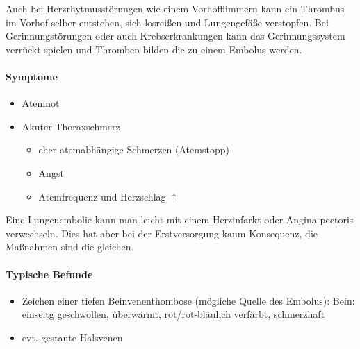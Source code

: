 Auch bei Herzrhytmusstörungen wie einem
Vorhofflimmern kann ein Thrombus im Vorhof selber entstehen, 
sich losreißen und Lungengefäße verstopfen. Bei
Gerinnungstörungen oder auch Krebserkrankungen kann das
Gerinnungssystem verrückt spielen und Thromben bilden die
zu einem Embolus werden.


\paragraph{Symptome}

\begin{itemize}
    \item Atemnot
    \item Akuter Thoraxschmerz
    \begin{itemize}
        \item eher atemabhängige Schmerzen (Atemstopp)
    \end{itemize}
    \begin{itemize}
        \item Angst
        \item Atemfrequenz und Herzschlag ${\uparrow}$
    \end{itemize}
\end{itemize}

Eine Lungenembolie kann man leicht mit einem Herzinfarkt oder Angina
pectoris verwechseln. Dies hat aber bei der Erstversorgung kaum
Konsequenz, die Maßnahmen sind die gleichen.

\paragraph{Typische Befunde}

\begin{itemize}
    \item Zeichen einer tiefen Beinvenenthombose (mögliche
    Quelle des Embolus): Bein: einseitg geschwollen,
    überwärmt, rot/rot-bläulich verfärbt, schmerzhaft
    \item evt. gestaute Halsvenen
    
\end{itemize}

